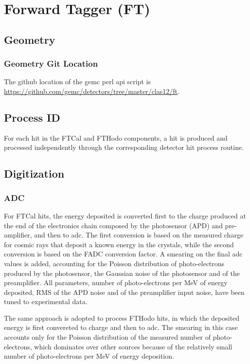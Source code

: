 \section{Forward Tagger (FT)}


\subsection{Geometry}

\subsubsection{Geometry Git Location}
The github location of the gemc perl api script is \url{https://github.com/gemc/detectors/tree/master/clas12/ft}.

\subsection{Process ID}
For each hit in the FTCal and FTHodo components, a hit is produced and processed independently through the corresponding detector hit process routine.

\subsection{Digitization}


\subsubsection{ADC}
For FTCal hits, the energy deposited is converted first to the charge produced at the end of the electronics chain composed by the photosensor (APD) and pre-amplifier, and then to adc. The first conversion is based on the measured charge for cosmic rays that deposit a known energy in the crystals, while the second conversion is based on the FADC conversion factor. A smearing on the final adc values is added, accounting for the Poisson distribution of photo-electrons produced by the photosensor, the Gaussian noise of the photosensor and of the preamplifier. All parameters, number of photo-electrons per MeV of energy deposited, RMS of the APD noise and of the preamplifier input noise, have been tuned to experimental data.

The same approach is adopted to process FTHodo hits, in which the deposited energy is first convereted to charge and then to adc. The smearing in this case accounts only for the Poisson distribution of the measured number of photo-electrons, which dominates over other sources because of the relatively small number of photo-electrons per MeV of energy deposition.

